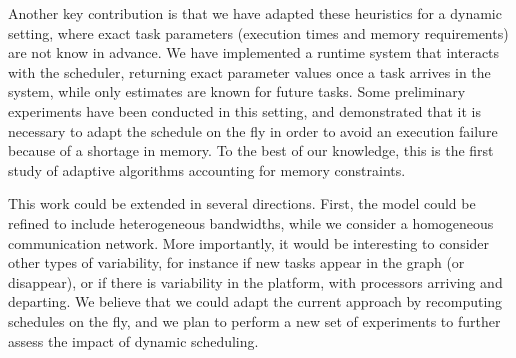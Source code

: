 \documentclass[conference]{IEEEtran}
\newcommand{\algo}[1]{\textsc{#1}}
\newcommand{\heftmm}{\algo{HEFTM-MM}\xspace}
\newcommand{\heftbl}{\algo{HEFTM-BL}\xspace}
\newcommand{\heftblc}{\algo{HEFTM-BLC}\xspace}
\begin{document}
%

Another key contribution is that we have adapted these heuristics for a dynamic setting, where exact
task parameters (execution times and memory requirements) are not know in advance. 
We have implemented a runtime system that interacts with the scheduler, returning exact
parameter values once a task arrives in the system, while only estimates are known for future tasks. 
Some preliminary experiments have been conducted in this setting, and demonstrated that
it is necessary to adapt the schedule on the fly in order to avoid an execution failure because
of a shortage in memory. To the best of our knowledge, this is the first study of adaptive
algorithms accounting for memory constraints. 

This work could be extended in several directions. First, the model could be refined to include
heterogeneous bandwidths, while we consider a homogeneous communication network. 
More importantly, it would be interesting to consider other types of variability, for instance
if new tasks appear in the graph (or disappear), or if there is variability in the platform, 
with processors arriving and departing. We believe that we could adapt the current approach
by recomputing schedules on the fly, and we plan to perform a new set of experiments
to further assess the impact of dynamic scheduling. 

%

\balance
    
\end{document}
